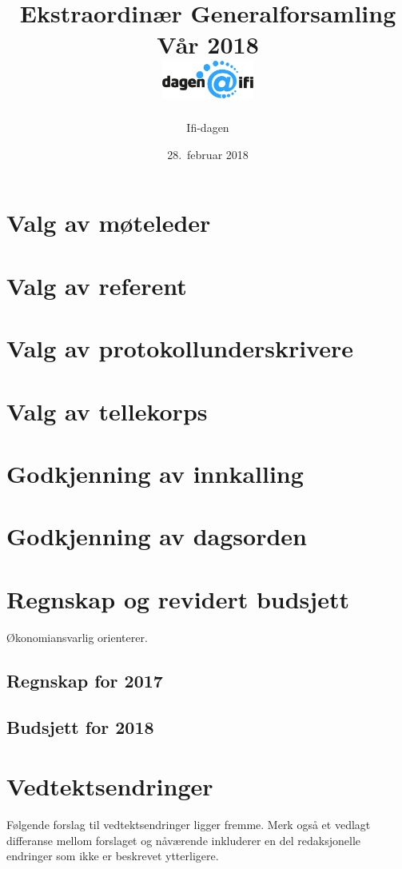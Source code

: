 \documentclass[10pt,norsk,a4paper]{article}
\title{Ekstraordinær Generalforsamling \\
	Vår 2018\\[3cm]
	\includegraphics[width=3cm,trim=0 4cm 0 0]{../res/logo.png}\\}
\date{28.\ februar 2018}
\author{Ifi-dagen}
\begin{document}
\maketitle{}
\newpage
\tableofcontents{}
\newpage


\section{Valg av møteleder}

\section{Valg av referent}

\section{Valg av protokollunderskrivere}

\section{Valg av tellekorps}

\section{Godkjenning av innkalling}

\section{Godkjenning av dagsorden}

\section{Regnskap og revidert budsjett}
Økonomiansvarlig orienterer.
\subsection{Regnskap for 2017}

\subsection{Budsjett for 2018}

\section{Vedtektsendringer}
Følgende forslag til vedtektsendringer ligger fremme. Merk også et vedlagt differanse mellom forslaget og nåværende inkluderer en del redaksjonelle endringer som ikke er beskrevet ytterligere.
\end{document}
